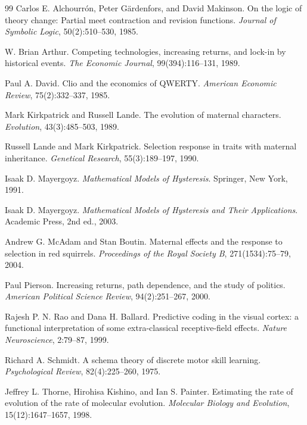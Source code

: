 \documentclass[11pt,a4paper]{article}
\theoremstyle{remark}
\begin{document}
\begin{thebibliography}{99}
Carlos E. Alchourr\'on, Peter G\"ardenfors, and David Makinson.
\newblock On the logic of theory change: Partial meet contraction and revision functions.
\newblock \emph{Journal of Symbolic Logic}, 50(2):510--530, 1985.

W. Brian Arthur.
\newblock Competing technologies, increasing returns, and lock-in by historical events.
\newblock \emph{The Economic Journal}, 99(394):116--131, 1989.

Paul A. David.
\newblock Clio and the economics of QWERTY.
\newblock \emph{American Economic Review}, 75(2):332--337, 1985.

Mark Kirkpatrick and Russell Lande.
\newblock The evolution of maternal characters.
\newblock \emph{Evolution}, 43(3):485--503, 1989.

Russell Lande and Mark Kirkpatrick.
\newblock Selection response in traits with maternal inheritance.
\newblock \emph{Genetical Research}, 55(3):189--197, 1990.

Isaak D. Mayergoyz.
\newblock \emph{Mathematical Models of Hysteresis}.
\newblock Springer, New York, 1991.

Isaak D. Mayergoyz.
\newblock \emph{Mathematical Models of Hysteresis and Their Applications}.
\newblock Academic Press, 2nd ed., 2003.

Andrew G. McAdam and Stan Boutin.
\newblock Maternal effects and the response to selection in red squirrels.
\newblock \emph{Proceedings of the Royal Society B}, 271(1534):75--79, 2004.

Paul Pierson.
\newblock Increasing returns, path dependence, and the study of politics.
\newblock \emph{American Political Science Review}, 94(2):251--267, 2000.

Rajesh P. N. Rao and Dana H. Ballard.
\newblock Predictive coding in the visual cortex: a functional interpretation of some extra-classical receptive-field effects.
\newblock \emph{Nature Neuroscience}, 2:79--87, 1999.

Richard A. Schmidt.
\newblock A schema theory of discrete motor skill learning.
\newblock \emph{Psychological Review}, 82(4):225--260, 1975.

Jeffrey L. Thorne, Hirohisa Kishino, and Ian S. Painter.
\newblock Estimating the rate of evolution of the rate of molecular evolution.
\newblock \emph{Molecular Biology and Evolution}, 15(12):1647--1657, 1998.

\end{thebibliography}
\end{document}
